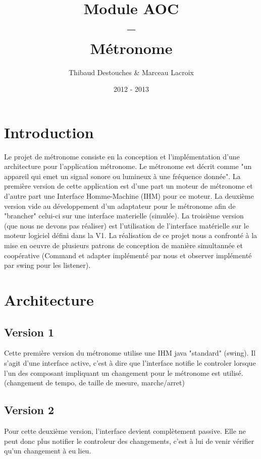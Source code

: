 \documentclass{article}
\title{Module AOC
\\
--
\\
Métronome}
\author{Thibaud Destouches \& Marceau Lacroix}
\date{2012 - 2013}
\begin{document}
\begin{titlepage}
\maketitle
\tableofcontents
\end{titlepage}

\newpage
\section{Introduction}
Le projet de métronome consiste en la conception et l'implémentation d'une architecture pour l'application métronome. Le métronome est décrit comme "un appareil qui emet un signal sonore ou lumineux à une fréquence donnée". La première version de cette application est d'une part un moteur de métronome et d'autre part une Interface Homme-Machine (IHM) pour ce moteur. La deuxième version vide au développement d'un adaptateur pour le métronome afin de "brancher" celui-ci sur une interface materielle (simulée). La troisième version (que nous ne devons pas réaliser) est l'utilisation de l'interface matérielle sur le moteur logiciel défini dans la V1. La réalisation de ce projet nous a confronté à la mise en oeuvre de plusieurs patrons de conception de manière simultannée et coopérative (Command et adapter implémenté par nous et observer implémenté par swing pour les listener). 

\section{Architecture}
\subsection{Version 1}
Cette première version du métronome utilise une IHM java "standard" (swing). Il s'agit d'une interface active, c'est à dire que l'interface notifie le controler lorsque l'un des composant impliquant un changement pour le métronome est utilisé. (changement de tempo, de taille de mesure, marche/arret)


\subsection{Version 2}
Pour cette deuxième version, l'interface devient complètement passive. Elle ne peut donc plus notifier le controleur des changements, c'est à lui de venir vérifier qu'un changement à eu lieu.
\end{document}
